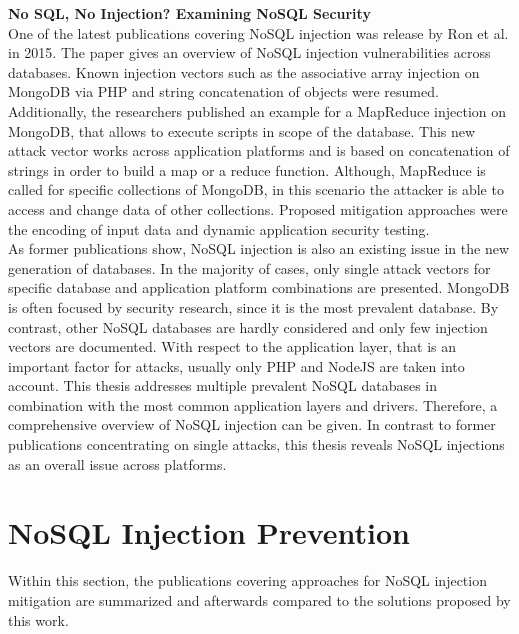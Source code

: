 \textbf{No SQL, No Injection? Examining NoSQL Security} \cite{Ron:2015} \\
One of the latest publications covering NoSQL injection was release by Ron et al. in 2015. The paper gives an overview of NoSQL injection vulnerabilities across databases. Known injection vectors such as the associative array injection on MongoDB via PHP \cite{Sullivan:2011} and string concatenation of objects \cite{Oftedal:2010} were resumed. Additionally, the researchers published an example for a MapReduce injection on MongoDB, that allows to execute scripts in scope of the database. This new attack vector works across application platforms and is based on concatenation of strings in order to build a map or a reduce function. Although, MapReduce is called for specific collections of MongoDB, in this scenario the attacker is able to access and change data of other collections. Proposed mitigation approaches were the encoding of input data and dynamic application security testing.\\

As former publications show, NoSQL injection is also an existing issue in the new generation of databases. In the majority of cases, only single attack vectors for specific database and application platform combinations are presented. MongoDB is often focused by security research, since it is the most prevalent database. By contrast, other NoSQL databases are hardly considered and only few injection vectors are documented. With respect to the application layer, that is an important factor for attacks, usually only PHP and NodeJS are taken into account. This thesis addresses multiple prevalent NoSQL databases in combination with the most common application layers and drivers. Therefore, a comprehensive overview of NoSQL injection can be given. In contrast to former publications concentrating on single attacks, this thesis reveals NoSQL injections as an overall issue across platforms.\\

\section{NoSQL Injection Prevention}
Within this section, the publications covering approaches for NoSQL injection mitigation are summarized and afterwards compared to the solutions proposed by this work. \\

